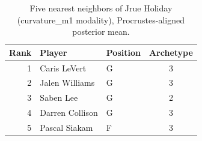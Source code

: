 \begin{table}[htbp]
  \centering\small
  \begin{tabular}{rllc}
    \toprule
    Rank & Player & Position & Archetype \\
    \midrule
    1 & Caris LeVert & G & 3 \\
    2 & Jalen Williams & G & 3 \\
    3 & Saben Lee & G & 2 \\
    4 & Darren Collison & G & 3 \\
    5 & Pascal Siakam & F & 3 \\
    \bottomrule
  \end{tabular}
  \caption{Five nearest neighbors of Jrue Holiday (curvature_m1 modality), Procrustes-aligned posterior mean.}
  \label{tab:Jrue_Holiday_neighbors_curvature_m1}
\end{table}

